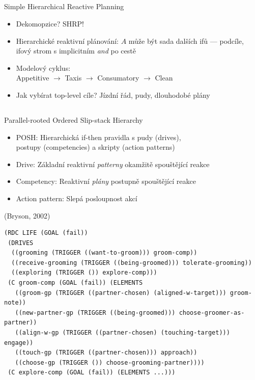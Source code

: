 \documentclass{beamer}
\begin{document}
\subsection{}
\begin{frame}{Simple Hierarchical Reactive Planning}
\begin{itemize}
\item Dekomopzice? SHRP!
\item Hierarchické reaktivní plánování:
	$A$ může být sada dalších ifů --- podcíle,
	ifový strom s implicitním {\em and} po cestě
\item Modelový cyklus: \\ Appetitive $\to$ Taxis $\to$ Consumatory $\to$ Clean
\item Jak vybírat top-level cíle? Jízdní řád, pudy, dlouhodobé plány
\end{itemize}
\end{frame}

\subsection{}
\begin{frame}[fragile]{Parallel-rooted Ordered Slip-stack Hierarchy}
\begin{itemize}
\item POSH: Hierarchická if-then pravidla s pudy (drives), \\ postupy (competencies) a skripty (action patterns)
\item Drive: Základní reaktivní {\em patterny} okamžitě spouštějící reakce
\item Competency: Reaktivní {\em plány} postupně spouštějící reakce
\item Action pattern: Slepá posloupnost akcí
\end{itemize}

\hfill {\tiny (Bryson, 2002)}
\begin{lstlisting}
(RDC LIFE (GOAL (fail))
 (DRIVES
  ((grooming (TRIGGER ((want-to-groom))) groom-comp))
  ((receive-grooming (TRIGGER ((being-groomed))) tolerate-grooming))
  ((exploring (TRIGGER ()) explore-comp)))
 (C groom-comp (GOAL (fail)) (ELEMENTS
   ((groom-gp (TRIGGER ((partner-chosen) (aligned-w-target))) groom-note))
   ((new-partner-gp (TRIGGER ((being-groomed))) choose-groomer-as-partner))
   ((align-w-gp (TRIGGER ((partner-chosen) (touching-target))) engage))
   ((touch-gp (TRIGGER ((partner-chosen))) approach))
   ((choose-gp (TRIGGER ()) choose-grooming-partner))))
 (C explore-comp (GOAL (fail)) (ELEMENTS ...)))
\end{lstlisting}
\end{frame}
\end{document}
